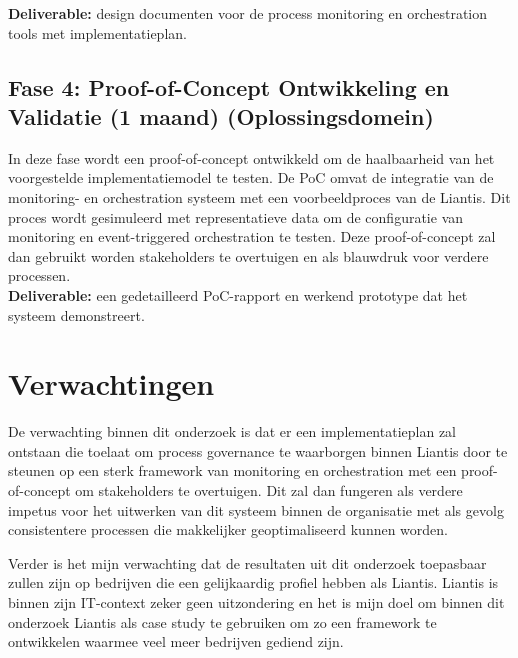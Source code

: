 \textbf{Deliverable:} design documenten voor de process monitoring en orchestration tools met implementatieplan.

\subsection{Fase 4: Proof-of-Concept Ontwikkeling en Validatie (1 maand) (Oplossingsdomein)}

In deze fase wordt een proof-of-concept ontwikkeld om de haalbaarheid van het voorgestelde implementatiemodel te testen. De PoC omvat de integratie van de monitoring- en orchestration systeem met een voorbeeldproces van de Liantis. Dit proces wordt gesimuleerd met representatieve data om de configuratie van monitoring en event-triggered orchestration te testen. Deze proof-of-concept zal dan gebruikt worden stakeholders te overtuigen en als blauwdruk voor verdere processen. \\

\textbf{Deliverable:} een gedetailleerd PoC-rapport en werkend prototype dat het systeem demonstreert.

\section{Verwachtingen}%
\label{sec:verwachtingen}
De verwachting binnen dit onderzoek is dat er een implementatieplan zal ontstaan die toelaat om process governance te waarborgen binnen Liantis door te steunen op een sterk framework van monitoring en orchestration met een proof-of-concept om stakeholders te overtuigen. Dit zal dan fungeren als verdere impetus voor het uitwerken van dit systeem binnen de organisatie met als gevolg consistentere processen die makkelijker geoptimaliseerd kunnen worden.

Verder is het mijn verwachting dat de resultaten uit dit onderzoek toepasbaar zullen zijn op bedrijven die een gelijkaardig profiel hebben als Liantis. Liantis is binnen zijn IT-context zeker geen uitzondering en het is mijn doel om binnen dit onderzoek Liantis als case study te gebruiken om zo een framework te ontwikkelen waarmee veel meer bedrijven gediend zijn.

